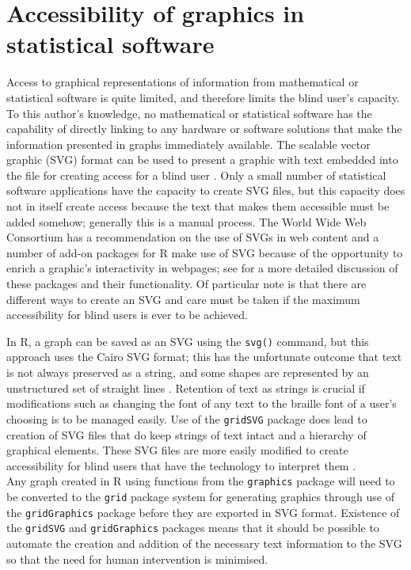 \documentclass[
]{book}
\begin{document}
\hypertarget{accessibility-of-graphics-in-statistical-software}{%
\section{Accessibility of graphics in statistical software}\label{accessibility-of-graphics-in-statistical-software}}

Access to graphical representations of information from mathematical or statistical software is quite limited, and therefore limits the blind user's capacity. To this author's knowledge, no mathematical or statistical software has the capability of directly linking to any hardware or software solutions that make the information presented in graphs immediately available. The scalable vector graphic (SVG) format can be used to present a graphic with text embedded into the file for creating access for a blind user \citep{BulatovGardner2004SVG, GardnerBulatov2010SVG}.
Only a small number of statistical software applications have the capacity to create SVG files, but this capacity does not in itself create access because the text that makes them accessible must be added somehow; generally this is a manual process. The World Wide Web Consortium has a recommendation on the use of SVGs in web content \citep{SVGStandard} and a number of add-on packages for R make use of SVG because of the opportunity to enrich a graphic's interactivity in webpages; see \citep{MurrellPotter2014} for a more detailed discussion of these packages and their functionality. Of particular note is that there are different ways to create an SVG and care must be taken if the maximum accessibility for blind users is ever to be achieved.

In R, a graph can be saved as an SVG using the \texttt{svg()} command, but this approach uses the Cairo SVG format; this has the unfortunate outcome that text is not always preserved as a string, and some shapes are represented by an unstructured set of straight lines \citep{GardnerBulatov2010SVG}.
Retention of text as strings is crucial if modifications such as changing the font of any text to the braille font of a user's choosing is to be managed easily.
Use of the \texttt{gridSVG} package \citep{MurrellPotter2014} does lead to creation of SVG files that do keep strings of text intact and a hierarchy of graphical elements. These SVG files are more easily modified to create accessibility for blind users that have the technology to interpret them \citep{GardnerBulatov2010SVG}.\\
Any graph created in R using functions from the \texttt{graphics} package will need to be converted to the \texttt{grid} package system for generating graphics through use of the \texttt{gridGraphics} \citep{Murrell2015GridGraphics} package before they are exported in SVG format. Existence of the \texttt{gridSVG} and \texttt{gridGraphics} packages means that it should be possible to automate the creation and addition of the necessary text information to the SVG so that the need for human intervention is minimised.
\end{document}
